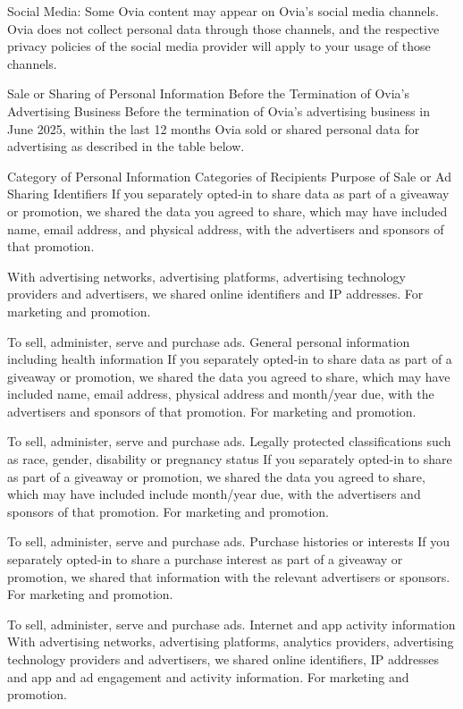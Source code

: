 Social Media: Some Ovia content may appear on Ovia’s social media channels. Ovia does not collect personal data through those channels, and the respective privacy policies of the social media provider will apply to your usage of those channels.

Sale or Sharing of Personal Information Before the Termination of Ovia’s Advertising Business
Before the termination of Ovia’s advertising business in June 2025, within the last 12 months Ovia sold or shared personal data for advertising as described in the table below.

Category of Personal Information	Categories of Recipients	Purpose of Sale or Ad Sharing
Identifiers	If you separately opted-in to share data as part of a giveaway or promotion, we shared the data you agreed to share, which may have included name, email address, and physical address, with the advertisers and sponsors of that promotion.

With advertising networks, advertising platforms,  advertising technology providers and advertisers, we shared online identifiers and IP addresses.
For marketing and promotion.

To sell, administer, serve and purchase ads.
General personal information including health information	If you separately opted-in to share data as part of a giveaway or promotion, we shared the data you agreed to share, which may have included name, email address, physical address and month/year due, with the advertisers and sponsors of that promotion.	For marketing and promotion.

To sell, administer, serve and purchase ads.
Legally protected classifications such as race, gender, disability or pregnancy status	If you separately opted-in to share as part of a giveaway or promotion, we shared the data you agreed to share, which may have included include month/year due, with the advertisers and sponsors of that promotion.	For marketing and promotion.

To sell, administer, serve and purchase ads.
Purchase histories or interests	If you separately opted-in to share a purchase interest as part of a giveaway or promotion, we shared that information with the relevant advertisers or sponsors.	For marketing and promotion.

To sell, administer, serve and purchase ads.
Internet and app activity information	With advertising networks, advertising platforms, analytics providers, advertising technology providers and advertisers, we shared online identifiers, IP addresses and app and ad engagement and activity information.	For marketing and promotion.

